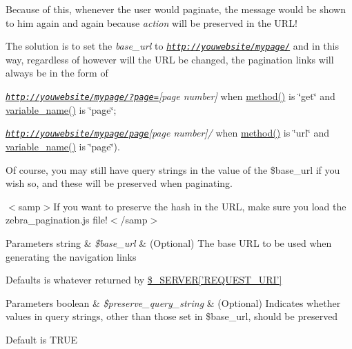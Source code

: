 Because of this, whenever the user would paginate, the message would be shown to him again and again because {\itshape action} will be preserved in the U\-R\-L!

The solution is to set the {\itshape base\-\_\-url} to {\itshape \href{http://youwebsite/mypage/}{\tt http\-://youwebsite/mypage/}} and in this way, regardless of however will the U\-R\-L be changed, the pagination links will always be in the form of


\begin{DoxyItemize}
\item {\itshape \href{http://youwebsite/mypage/?page=}{\tt http\-://youwebsite/mypage/?page=}\mbox{[}page number\mbox{]}} when \hyperlink{class_zebra___pagination_a93a61d5a2937ad62c9aeb3ccfc61692f}{method()} is \char`\"{}get\char`\"{} and \hyperlink{class_zebra___pagination_af1e77b3f2c7c052d66345e9e801aef4d}{variable\-\_\-name()} is \char`\"{}page\char`\"{};
\item {\itshape \href{http://youwebsite/mypage/page}{\tt http\-://youwebsite/mypage/page}\mbox{[}page number\mbox{]}/} when \hyperlink{class_zebra___pagination_a93a61d5a2937ad62c9aeb3ccfc61692f}{method()} is \char`\"{}url\char`\"{} and \hyperlink{class_zebra___pagination_af1e77b3f2c7c052d66345e9e801aef4d}{variable\-\_\-name()} is \char`\"{}page\char`\"{}).
\end{DoxyItemize}

Of course, you may still have query strings in the value of the \$base\-\_\-url if you wish so, and these will be preserved when paginating.

$<$samp$>$If you want to preserve the hash in the U\-R\-L, make sure you load the zebra\-\_\-pagination.\-js file!$<$/samp$>$


\begin{DoxyParams}[1]{Parameters}
string & {\em \$base\-\_\-url} & (Optional) The base U\-R\-L to be used when generating the navigation links\\
\hline
\end{DoxyParams}
Defaults is whatever returned by \hyperlink{}{\$\-\_\-\-S\-E\-R\-V\-E\-R\mbox{[}'R\-E\-Q\-U\-E\-S\-T\-\_\-\-U\-R\-I'\mbox{]}}


\begin{DoxyParams}[1]{Parameters}
boolean & {\em \$preserve\-\_\-query\-\_\-string} & (Optional) Indicates whether values in query strings, other than those set in \$base\-\_\-url, should be preserved\\
\hline
\end{DoxyParams}
Default is T\-R\-U\-E

